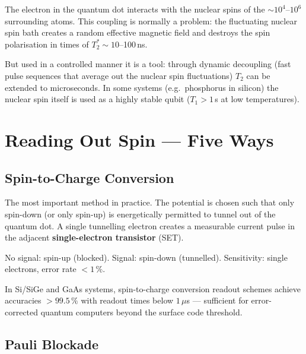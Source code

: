 The electron in the quantum dot interacts with the
nuclear spins of the $\sim 10^4$--$10^6$ surrounding atoms.
This coupling is normally a problem:
the fluctuating nuclear spin bath creates a
random effective magnetic field and destroys
the spin polarisation in times of $T_2^* \sim 10$--100\,ns.

But used in a controlled manner it is a tool:
through dynamic decoupling (fast pulse sequences
that average out the nuclear spin fluctuations)
$T_2$ can be extended to microseconds.
In some systems (e.g.\ phosphorus in silicon)
the nuclear spin itself is used as a highly stable qubit
($T_1 > 1$\,s at low temperatures).

\section{Reading Out Spin --- Five Ways}
\label{sec:spin-readout}

\subsection{Spin-to-Charge Conversion}
\label{sec:spin-charge}

The most important method in practice.
The potential is chosen such that only spin-down
(or only spin-up) is energetically permitted to tunnel
out of the quantum dot.
A single tunnelling electron creates a
measurable current pulse in the adjacent
\textbf{single-electron transistor} (SET).

No signal: spin-up (blocked).
Signal: spin-down (tunnelled).
Sensitivity: single electrons, error rate $< 1\,\%$.

\begin{keyresult}
In Si/SiGe and GaAs systems,
spin-to-charge conversion readout schemes achieve
accuracies $> 99.5\,\%$ with readout times
below $1\,\mu$s --- sufficient for error-corrected
quantum computers beyond the surface code threshold.
\end{keyresult}

\subsection{Pauli Blockade}
\label{sec:pauli}

